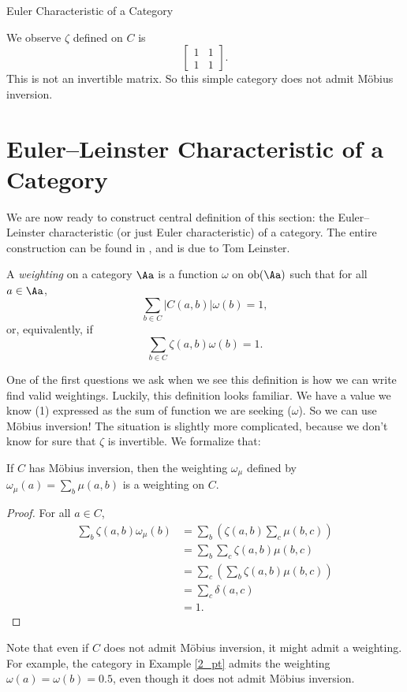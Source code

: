 \documentclass[12pt]{pom_thesis}
\DeclareMathOperator{\obj}{ob}
\begin{document}
\begin{chapter}{Euler Characteristic of a Category}
\begin{examp}
We observe $\zeta$ defined on $C$ is
\[\begin{bmatrix}1 & 1 \\ 1 & 1 \end{bmatrix}.\]
This is not an invertible matrix. So this simple category does not admit M\"obius inversion.
\end{examp} 

\section{Euler--Leinster Characteristic of a Category}
We are now ready to construct central definition of this section: the Euler--Leinster characteristic (or just Euler characteristic) of a category. The entire construction can be found in \cite{Lein1, Lein2, Lein4}, and is due to Tom Leinster.

\begin{defn}\label{def_weighting}
A \emph{weighting} on a category $\Aa$ is a function $\omega$ on $\obj(\Aa)$ such that for all $a \in \Aa$,
\[
\sum_{b \in C}|C(a,b)|\omega(b) = 1,
\]
or, equivalently, if
\[
\sum_{b \in C}\zeta(a,b)\omega(b) = 1.
\]
\end{defn}

One of the first questions we ask when we see this definition is how we can write find valid weightings. Luckily, this definition looks familiar. We have a value we know (1) expressed as the sum of function we are seeking ($\omega$). So we can use M\"obius inversion! The situation is slightly more complicated, because we don't know for sure that $\zeta$ is invertible. We formalize that:

\begin{lemma}
\label{mobius_is_weighting}
If $C$ has M\"obius inversion, then the weighting $\omega_\mu$ defined by $\omega_\mu(a) = \sum_b \mu(a,b)$ is a weighting on $C$.
\end{lemma}
\begin{proof} For all $a \in C$,
\begin{align*}
\sum_b \zeta(a,b)\omega_\mu(b) &= \sum_b\left( \zeta(a,b)\sum_c \mu(b,c)\right)\\
&=\sum_b\sum_c\zeta(a,b)\mu(b,c)\\
&=\sum_c\left(\sum_b\zeta(a,b)\mu(b,c)\right)\\
&=\sum_c \delta(a,c)\\
&=1.
\end{align*}
\end{proof}

Note that even if $C$ does not admit M\"obius inversion, it might admit a weighting. For example, the category in Example \ref{2_pt} admits the weighting $\omega(a) = \omega(b) = 0.5$, even though it does not admit M\"obius inversion.


\end{chapter}
\end{document}
